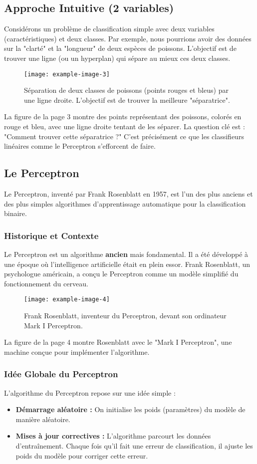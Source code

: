 \documentclass{article}
\begin{document}
\subsection{Approche Intuitive (2 variables)}
Considérons un problème de classification simple avec deux variables (caractéristiques) et deux classes. Par exemple, nous pourrions avoir des données sur la "clarté" et la "longueur" de deux espèces de poissons. L'objectif est de trouver une ligne (ou un hyperplan) qui sépare au mieux ces deux classes.
\begin{figure}[h!]
    \centering
    \texttt{[image: example-image-3]} %
    \caption{Séparation de deux classes de poissons (points rouges et bleus) par une ligne droite. L'objectif est de trouver la meilleure "séparatrice".}
\end{figure}
La figure de la page 3 montre des points représentant des poissons, colorés en rouge et bleu, avec une ligne droite tentant de les séparer. La question clé est : "Comment trouver cette séparatrice ?" C'est précisément ce que les classifieurs linéaires comme le Perceptron s'efforcent de faire.

\subsection{Le Perceptron}
Le Perceptron, inventé par Frank Rosenblatt en 1957, est l'un des plus anciens et des plus simples algorithmes d'apprentissage automatique pour la classification binaire.

\subsubsection{Historique et Contexte}
Le Perceptron est un algorithme \textbf{ancien} mais fondamental. Il a été développé à une époque où l'intelligence artificielle était en plein essor. Frank Rosenblatt, un psychologue américain, a conçu le Perceptron comme un modèle simplifié du fonctionnement du cerveau.
\begin{figure}[h!]
    \centering
    \texttt{[image: example-image-4]} %
    \caption{Frank Rosenblatt, inventeur du Perceptron, devant son ordinateur Mark I Perceptron.}
\end{figure}
La figure de la page 4 montre Rosenblatt avec le "Mark I Perceptron", une machine conçue pour implémenter l'algorithme.

\subsubsection{Idée Globale du Perceptron}
L'algorithme du Perceptron repose sur une idée simple :
\begin{itemize}
    \item \textbf{Démarrage aléatoire :} On initialise les poids (paramètres) du modèle de manière aléatoire.
    \item \textbf{Mises à jour correctives :} L'algorithme parcourt les données d'entraînement. Chaque fois qu'il fait une erreur de classification, il ajuste les poids du modèle pour corriger cette erreur.
\end{itemize}
\end{document}
